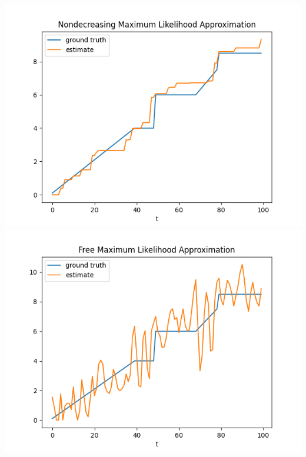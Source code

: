 \documentclass{article}
\begin{document}
\begin{enumerate}
    \begin{center}
    	\includegraphics[scale=0.5]{p1_plot_nondecreasing}
    	\includegraphics[scale=0.5]{p1_plot_free}
    \end{center}


\end{enumerate}
\end{document}
